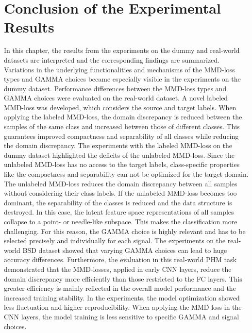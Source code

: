 \section{Conclusion of the Experimental Results}\label{sec:Performance_overview}
In this chapter, the results from the experiments on the dummy and real-world datasets are interpreted and the corresponding findings are summarized. Variations in the underlying functionalities and mechanisms of the MMD-loss types and GAMMA choices became especially visible in the experiments on the dummy dataset. Performance differences between the MMD-loss types and GAMMA choices were evaluated on the real-world dataset. A novel labeled MMD-loss was developed, which considers the source and target labels. When applying the labeled MMD-loss, the domain discrepancy is reduced between the samples of the same class and increased between those of different classes. This guarantees improved compactness and separability of all classes while reducing the domain discrepancy. The experiments with the labeled MMD-loss on the dummy dataset highlighted the deficits of the unlabeled MMD-loss. Since the unlabeled MMD-loss has no access to the target labels, class-specific properties like the compactness and separability can not be optimized for the target domain. The unlabeled MMD-loss reduces the domain discrepancy between all samples without considering their class labels. If the unlabeled MMD-loss becomes too dominant, the separability of the classes is reduced and the data structure is destroyed. In this case, the latent feature space representations of all samples collapse to a point- or needle-like subspace. This makes the classification more challenging. For this reason, the GAMMA choice is highly relevant and has to be selected precisely and individually for each signal. The experiments on the real-world BSD dataset showed that varying GAMMA choices can lead to huge  accuracy differences. Furthermore, the evaluation in this real-world PHM task demonstrated that the MMD-losses, applied in early CNN layers, reduce the domain discrepancy more efficiently than those restricted to the FC layers. This greater efficiency is mainly reflected in the overall model performance and the increased training stability. In the experiments, the model optimization showed less fluctuation and higher reproducibility. When applying the MMD-loss in the CNN layers, the model training is less sensitive to specific GAMMA and signal choices. 